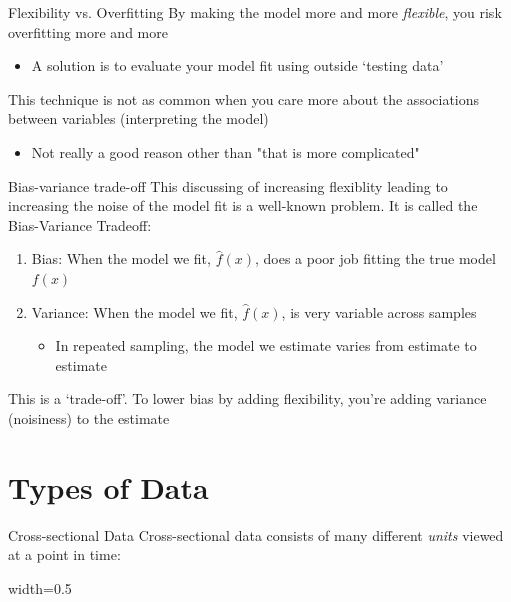 \documentclass[aspectratio=169,t,11pt,table]{beamer}
\newenvironment{scaledtable}[1]{%
  \begingroup
  \renewenvironment{table}{}{}%
  \begin{center}%
  \begin{adjustbox}{width=#1}%
}{%
  \end{adjustbox}%
  \end{center}%
  \endgroup
}
\begin{document}
\begin{frame}{Flexibility vs. Overfitting}
  By making the model more and more \emph{flexible}, you risk overfitting more and more

  \begin{itemize}
    \item A solution is to evaluate your model fit using outside `testing data'
  \end{itemize}

  \pause
  \bigskip
  This technique is not as common when you care more about the associations between variables (interpreting the model)
  \begin{itemize}
    \item Not really a good reason other than "that is more complicated"
  \end{itemize}
\end{frame}


\begin{frame}{Bias-variance trade-off}
  This discussing of increasing flexiblity leading to increasing the noise of the model fit is a well-known problem. It is called the \alert{Bias-Variance Tradeoff}:
  \begin{enumerate}
    \item \alert{Bias}: When the model we fit, $\hat{f}(x)$, does a poor job fitting the true model $f(x)$
    
    \item \alert{Variance}: When the model we fit, $\hat{f}(x)$, is very variable across samples
    \begin{itemize}
      \item In repeated sampling, the model we estimate varies from estimate to estimate
    \end{itemize}
  \end{enumerate}

  \pause
  \bigskip
  This is a `trade-off'. To lower bias by adding flexibility, you're adding variance (noisiness) to the estimate 
\end{frame}





\section{Types of Data}

\begin{frame}{Cross-sectional Data}
  \alert{Cross-sectional data} consists of many different \emph{units} viewed at a point in time:

  \vspace*{-\bigskipamount}
  \begin{scaledtable}{0.5\textwidth}
    
  \end{scaledtable}
\end{frame}
\end{document}
